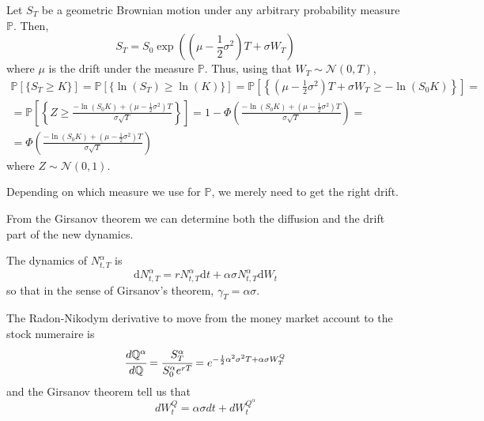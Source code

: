 \documentclass{beamer}
\begin{document}
\begin{frame}{}
Let $S_T$ be a geometric Brownian motion under any arbitrary probability measure $\mathbb{P}$. Then,
\begin{equation*}
S_T=S_0\exp\left(\left(\mu-\frac{1}{2}\sigma^2\right)T+\sigma W_T\right)
\end{equation*}
where $\mu$ is the drift under the measure $\mathbb{P}$. Thus, using that $W_T\sim \mathcal{N}(0,T)$,
\begin{equation*}
\begin{gathered}
\mathbb{P}[\{S_T\ge K\}]=\mathbb{P}[\{\ln(S_T)\ge \ln(K)\}]=\mathbb{P}\left[\left\{\left(\mu-\frac{1}{2}\sigma^2\right)T+\sigma  W_T\ge -\ln(S_0K)\right\}\right]= \\
=\mathbb{P}\left[\left\{Z\ge\frac{-\ln(S_0K)+\left(\mu-\frac{1}{2}\sigma^2\right)T}{\sigma\sqrt{T}}\right\}\right]=1-\Phi\left(\frac{-\ln(S_0K)+\left(\mu-\frac{1}{2}\sigma^2\right)T}{\sigma\sqrt{T}}\right)=\\
=\Phi\left(\frac{-\ln(S_0K)+\left(\mu-\frac{1}{2}\sigma^2\right)T}{\sigma\sqrt{T}}\right)
\end{gathered}
\end{equation*}
where $Z\sim \mathcal{N}(0,1)$. %
\end{frame}

\begin{frame}{}
Depending on which measure we use for $\mathbb{P}$, we merely need to get the right drift. 

From the Girsanov theorem we can determine both the diffusion and the drift part of the new dynamics.

The dynamics of $N^\alpha_{t,T}$ is 
\begin{equation*}
\mathrm{d}N_{t,T}^\alpha=rN_{t,T}^\alpha\mathrm{d}t+\alpha\sigma N_{t,T}^\alpha\mathrm{d}W_t
\end{equation*}
so that in the sense of Girsanov's theorem, $\gamma_T=\alpha\sigma$. 

The Radon-Nikodym derivative to move from the money market account to the stock numeraire is
\begin{equation*}\cfrac{d\mathbb{Q}^\alpha}{d\mathbb{Q}}=\cfrac{S^\alpha_T}{S^\alpha_0 e^{rT}}=e^{-\frac{1}{2}\alpha^2\sigma^2T+\alpha\sigma W^Q_T}
\end{equation*}
and the Girsanov theorem tell us that
\begin{equation*}
dW^Q_t=\alpha\sigma dt+dW^{Q^\alpha}_t
\end{equation*}
\end{frame}
\end{document}
